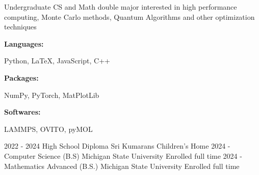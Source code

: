 \documentclass[9pt]{developercv} %
\begin{document}
\begin{minipage}[t]{0.46\textwidth}
	\vspace{-6pt}
	
	Undergraduate CS and Math double major interested in high performance computing, Monte Carlo methods, Quantum Algorithms and other optimization techniques\\
\end{minipage}
\hfill %
\begin{minipage}[t]{0.465\textwidth}
    \vspace{-6pt}
    
    \begin{minipage}[t]{0.2\textwidth}
        \textbf{Languages:}
    \end{minipage}
    \hfill
    \begin{minipage}[t]{0.73\textwidth}
      Python, \LaTeX, JavaScript, C++  
    \end{minipage}
    \vspace{4mm}
    
    \begin{minipage}[t]{0.2\textwidth}
        \textbf{Packages:}
    \end{minipage}
    \hfill
    \begin{minipage}[t]{0.73\textwidth}
      NumPy, PyTorch, MatPlotLib
    \end{minipage}
	\vspace{4mm}
	
	\begin{minipage}[t]{0.2\textwidth}
        \textbf{Softwares:}
    \end{minipage}
    \hfill
    \begin{minipage}[t]{0.73\textwidth}
    LAMMPS, OVITO, pyMOL
    \end{minipage}
    \vspace{1mm}
    
    
\end{minipage}

\vspace{-10 pt}
\begin{entrylist}
    \entry
		{2022 - 2024}
		{High School Diploma}
		{Sri Kumarans Children's Home}
		{}
    \entry
		{2024 - }
		{Computer Science (B.S)}
		{Michigan State University}
		{Enrolled full time}
	\entry
		{2024 - }
		{Mathematics Advanced (B.S.)}
		{Michigan State University}
		{Enrolled full time}

\end{entrylist}
\end{document}
